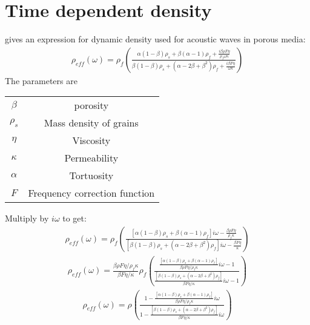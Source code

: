 \documentclass[11pt]{article}
\begin{document}
{%
\section*{Time dependent density}
\cite{Williams2001} gives an expression for dynamic density used for
acoustic waves in porous media:
\begin{eqnarray}
  \rho_{eff}(\omega) = 
\rho_f \left( 
              \frac{\alpha(1-\beta)\rho_s + \beta(\alpha-1)\rho_f 
                    + \frac{i \beta\rho F \eta}{\rho_f\omega\kappa}
              }
              {\beta(1-\beta)\rho_s + (\alpha -2\beta+\beta^2)\rho_f
                    + \frac{i \beta F \eta}{\omega\kappa}
              }
       \right)
\end{eqnarray}
The parameters are
\begin{center}
\begin{tabular}{ c c }
 $\beta$    & porosity                       \\ 
 $\rho_s$   & Mass density of grains         \\  
 $\eta$     & Viscosity                      \\
 $\kappa$   & Permeability                   \\
 $\alpha$   & Tortuosity                     \\
 $F$        & Frequency correction function
\end{tabular}
\end{center}

Multiply by $i\omega$ to get:
\begin{eqnarray}
  \rho_{eff}(\omega) = 
\rho_f \left( 
              \frac{[\alpha(1-\beta)\rho_s + \beta(\alpha-1)\rho_f]i\omega 
                    - \frac{\beta\rho F \eta}{\rho_f\kappa}
              }
              {[\beta(1-\beta)\rho_s + (\alpha -2\beta+\beta^2)\rho_f]i\omega
                    - \frac{ \beta F \eta}{\kappa}
              }
       \right)
\end{eqnarray}
\begin{eqnarray}
  \rho_{eff}(\omega) = 
 \frac{\beta\rho F \eta/\rho_f \kappa}{\beta F \eta/ \kappa}
\rho_f \left( 
              \frac{\frac{[\alpha(1-\beta)\rho_s + \beta(\alpha-1)\rho_f]}{\beta\rho F \eta/ \rho_f \kappa}i\omega 
              -1
              }
              {\frac{[\beta(1-\beta)\rho_s + (\alpha -2\beta+\beta^2)\rho_f]}{\beta F \eta/ \kappa} i\omega
              -1}
       \right)
\end{eqnarray}
\begin{eqnarray}
  \rho_{eff}(\omega) = 
\rho \left( 
              \frac{1-\frac{[\alpha(1-\beta)\rho_s + \beta(\alpha-1)\rho_f]}{\beta\rho F \eta/ \rho_f \kappa}i\omega 
              }
              {1-\frac{[\beta(1-\beta)\rho_s + (\alpha -2\beta+\beta^2)\rho_f]}{\beta F \eta/ \kappa} i\omega
              }
       \right)
\end{eqnarray}

}
\end{document}

